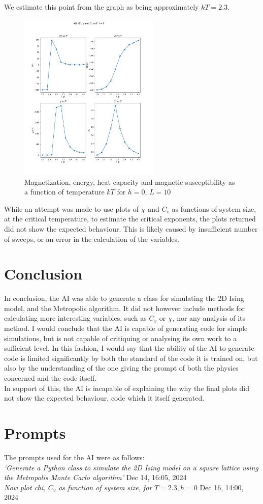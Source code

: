 \documentclass{article}
\theoremstyle{definition}
\theoremstyle{remark}
\begin{document}
We estimate this point from the graph as being approximately $kT=2.3$.\\
\begin{figure}
    \centering
    \includegraphics[width=0.6\textwidth]{T_graph_h=0.pdf}
    \caption{\label{fig: T_graph_h=0}Magnetization, energy, heat capacity and magnetic susceptibility as a function of temperature $kT$ for $h=0$, $L=10$}
\end{figure}
While an attempt was made to use plots of $\chi$ and $C_v$ as functions of system size, at the critical temperature, to estimate the critical exponents, the plots returned did not show the expected behaviour. This is likely caused by insufficient number of sweeps, or an error in the calculation of the variables.\\
\section{Conclusion}
In conclusion, the AI was able to generate a class for simulating the 2D Ising model, and the Metropolis algorithm. It did not however include methods for calculating more interesting variables, such as $C_v$ or $\chi$, nor any analysis of its method. I would conclude that the AI is capable of generating code for simple simulations, but is not capable of critiquing or analysing its own work to a sufficient level. In this fashion, I would say that the ability of the AI to generate code is limited significantly by both the standard of the code it is trained on, but also by the understanding of the one giving the prompt of both the physics concerned and the code itself.\\
In support of this, the AI is incapable of explaining the why the final plots did not show the expected behaviour, code which it itself generated.\\
\section{Prompts}
The prompts used for the AI were as follows:\\
\textit{`Generate a Python class to simulate the 2D Ising model on a square lattice using the Metropolis Monte Carlo algorithm'} Dec 14, 16:05, 2024\\
\textit{Now plot chi, $C_v$ as function of system size, for} $T=2.3, h=0$ Dec 16, 14:00, 2024 \\
\end{document}
